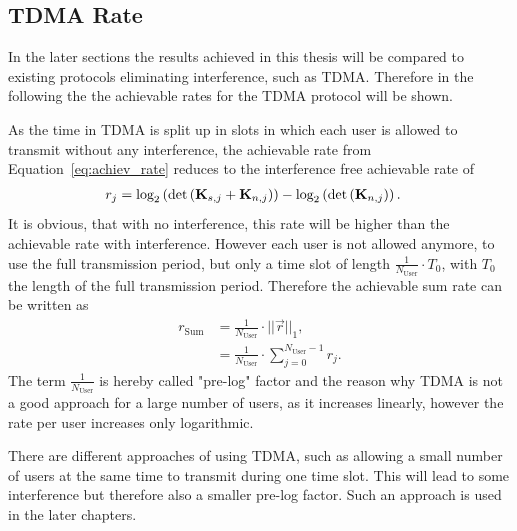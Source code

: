 \subsection{TDMA Rate}
\label{sec:tdma_rate}
In the later sections the results achieved in this thesis will be compared to existing protocols eliminating interference, such as TDMA.
Therefore in the following the the achievable rates for the TDMA protocol will be shown.

As the time in TDMA is split up in slots in which each user is allowed to transmit without any interference, the achievable rate from Equation~\eqref{eq:achiev_rate} reduces to the interference free achievable rate of 
\begin{align}
\label{eq:tdma_achiev_rate}
r_j  &=\text{log}_2\left(\text{det}\left(\mathbf{K}_{s,j}+\mathbf{K}_{n,j}\right)\right) -
	     	\text{log}_2\left(\text{det}\left(\mathbf{K}_{n,j}\right)\right).
\end{align}
It is obvious, that with no interference, this rate will be higher than the achievable rate with interference.
However each user is not allowed anymore, to use the full transmission period, but only a time slot of length $\frac{1}{N_\text{User}}\cdot T_0$, with $T_0$ the length of the full transmission period.
Therefore the achievable sum rate can be written as
\begin{align}
\label{eq:tdma_achiev_sum_rate}
\nonumber
r_\text{Sum} &= \frac{1}{N_\text{User}}\cdot||\vec{r}||_1,\\
&= \frac{1}{N_\text{User}}\cdot \sum_{j=0}^{N_\text{User}-1} r_j.
\end{align}
The term $\frac{1}{N_\text{User}}$ is hereby called "pre-log" factor and the reason why TDMA is not a good approach for a large number of users, as it increases linearly, however the rate per user increases only logarithmic.

There are different approaches of using TDMA, such as allowing a small number of users at the same time to transmit during one time slot.
This will lead to some interference but therefore also a smaller pre-log factor.
Such an approach is used in the later chapters.





